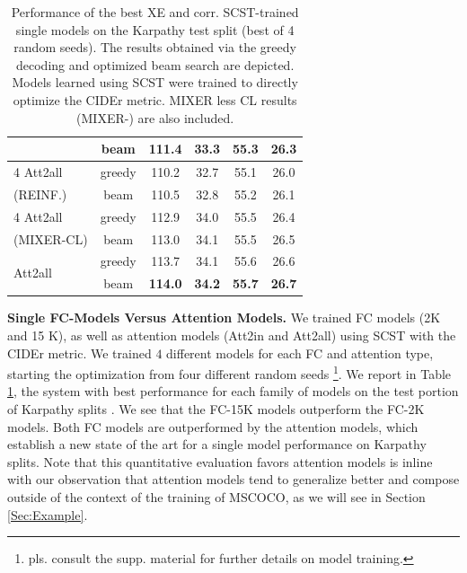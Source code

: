 \documentclass[10pt,twocolumn,letterpaper]{article}
\begin{document}
\begin{table}[th]
\begin{tabular}{l|c|cccc}
& beam & 111.4 & 33.3 &  55.3 &  26.3 \\ %
\hline
4 Att2all & greedy & 110.2 & 32.7 & 55.1 & 26.0 \\
(REINF.)& beam & 110.5 & 32.8 & 55.2 & 26.1 \\
\hline
4 Att2all & greedy & 112.9 & 34.0 & 55.5 & 26.4 \\ %
(MIXER-CL)& beam &113.0 & 34.1 & 55.5 & 26.5 \\
\hline
\multirow{2}{*}{Att2all} & greedy & 113.7 & 34.1 & 55.6 & 26.6 \\
& beam & {\bf 114.0} & {\bf 34.2} & {\bf 55.7} & {\bf 26.7} \\
\hline \hline
\end{tabular}

\caption{Performance of the best XE and corr. SCST-trained single models on the Karpathy test split (best of 4 random seeds). The results obtained via the greedy decoding and optimized beam search are depicted. Models learned using SCST were trained to directly optimize the CIDEr metric. MIXER less CL results (MIXER-) are also included.}
\label{tab:SingFcVsAtt}
\end{table}

\noindent \textbf{Single FC-Models Versus Attention Models.}  We trained  FC models (2K and 15 K), as well as  attention models  (Att2in and Att2all) using SCST with the CIDEr metric. We trained $4$ different models for each FC and attention type, starting the optimization  from four  different  random seeds \footnote{pls. consult the supp. material for further details on model training.}. We report in Table \ref{tab:SingFcVsAtt}, the system with best performance for each family of models on the test portion of Karpathy splits \cite{Karpathy}. We see that the FC-15K models outperform the FC-2K models. Both FC models are outperformed by the attention models, which  establish a new state of the art for a single model performance on Karpathy splits. Note that this quantitative evaluation favors attention models is inline with our observation that attention models tend to generalize better and compose outside of the context of the training of MSCOCO, as we will see in Section \ref{Sec:Example}.
\end{document}
